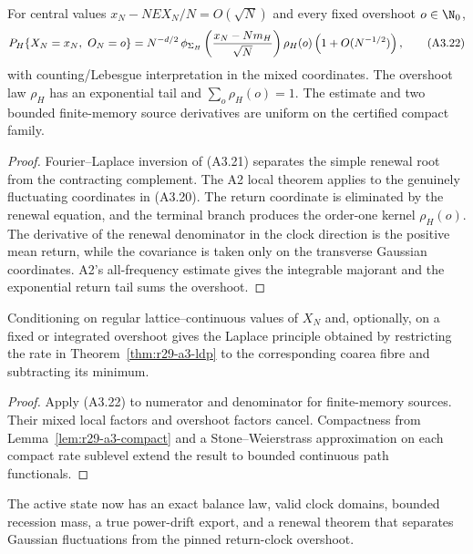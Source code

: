 \begin{theorem}
\label{thm:r29-a3-stopped}
For central values $x_N-NE X_N/N=O(\sqrt N)$ and every fixed overshoot
$o\in\N_0$,
\[
 P_H\{X_N=x_N,\ O_N=o\}
 =N^{-d/2}\,\phi_{\Sigma_H}
   \left({x_N-Nm_H\over\sqrt N}\right)
   \rho_H(o)\left(1+O(N^{-1/2})\right),                  \tag{A3.22}
\]
with counting/Lebesgue interpretation in the mixed coordinates.  The
overshoot law $\rho_H$ has an exponential tail and
$\sum_o\rho_H(o)=1$.  The estimate and two bounded finite-memory source
derivatives are uniform on the certified compact family.
\end{theorem}

\begin{proof}
Fourier--Laplace inversion of (A3.21) separates the simple renewal root from
the contracting complement.  The A2 local theorem applies to the genuinely
fluctuating coordinates in (A3.20).  The return coordinate is eliminated by
the renewal equation, and the terminal branch produces the order-one kernel
$\rho_H(o)$.  The derivative of the renewal denominator in the clock direction
is the positive mean return, while the covariance is taken only on the
transverse Gaussian coordinates.  A2's all-frequency estimate gives the
integrable majorant and the exponential return tail sums the overshoot.
\end{proof}

\begin{corollary}
\label{cor:r29-a3-conditioned}
Conditioning on regular lattice--continuous values of $X_N$ and, optionally,
on a fixed or integrated overshoot gives the Laplace principle obtained by
restricting the rate in Theorem~\ref{thm:r29-a3-ldp} to the corresponding
coarea fibre and subtracting its minimum.
\end{corollary}

\begin{proof}
Apply (A3.22) to numerator and denominator for finite-memory sources.  Their
mixed local factors and overshoot factors cancel.  Compactness from
Lemma~\ref{lem:r29-a3-compact} and a Stone--Weierstrass approximation on each
compact rate sublevel extend the result to bounded continuous path
functionals.
\end{proof}

The active state now has an exact balance law, valid clock domains, bounded
recession mass, a true power-drift export, and a renewal theorem that separates
Gaussian fluctuations from the pinned return-clock overshoot.
